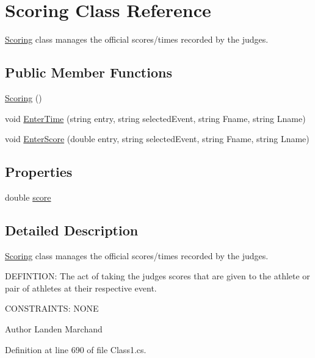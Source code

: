 \hypertarget{classScoring}{}\section{Scoring Class Reference}
\label{classScoring}


\hyperlink{classScoring}{Scoring} class manages the official scores/times recorded by the judges.  


\subsection*{Public Member Functions}
\begin{DoxyCompactItemize}
\item 
\hyperlink{classScoring_af50c5086e741aef0bb7b8c91e2d3f2f2}{Scoring} ()
\item 
void \hyperlink{classScoring_af08d1140b49215abf2a56a34d74249f6}{Enter\+Time} (string entry, string selected\+Event, string Fname, string Lname)
\item 
void \hyperlink{classScoring_a0943ddd7d6181c24c03c98c257cd6354}{Enter\+Score} (double entry, string selected\+Event, string Fname, string Lname)
\end{DoxyCompactItemize}
\subsection*{Properties}
\begin{DoxyCompactItemize}
\item 
double \hyperlink{classScoring_a98cbf9ebbee504f67d1ebcbb45f3bf40}{score}
\end{DoxyCompactItemize}


\subsection{Detailed Description}
\hyperlink{classScoring}{Scoring} class manages the official scores/times recorded by the judges. 

D\+E\+F\+I\+N\+T\+I\+ON\+: The act of taking the judges scores that are given to the athlete or pair of athletes at their respective event.

C\+O\+N\+S\+T\+R\+A\+I\+N\+TS\+: N\+O\+NE\begin{DoxyAuthor}{Author}
Landen Marchand 
\end{DoxyAuthor}


Definition at line 690 of file Class1.\+cs.



